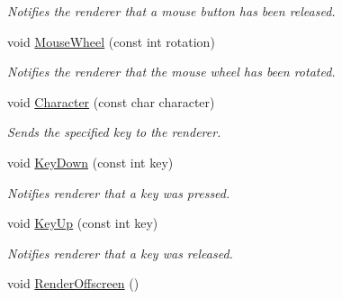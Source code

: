 \begin{DoxyCompactItemize}
\begin{DoxyCompactList}\small\item\em Notifies the renderer that a mouse button has been released. \end{DoxyCompactList}\item 
\hypertarget{class_u_i_renderer_a02a32cecd924b8a855bce495672f8e4e}{void \hyperlink{class_u_i_renderer_a02a32cecd924b8a855bce495672f8e4e}{Mouse\-Wheel} (const int rotation)}\label{class_u_i_renderer_a02a32cecd924b8a855bce495672f8e4e}

\begin{DoxyCompactList}\small\item\em Notifies the renderer that the mouse wheel has been rotated. \end{DoxyCompactList}\item 
\hypertarget{class_u_i_renderer_ac6c071a178d51415329bf4f4f71dfd48}{void \hyperlink{class_u_i_renderer_ac6c071a178d51415329bf4f4f71dfd48}{Character} (const char character)}\label{class_u_i_renderer_ac6c071a178d51415329bf4f4f71dfd48}

\begin{DoxyCompactList}\small\item\em Sends the specified key to the renderer. \end{DoxyCompactList}\item 
\hypertarget{class_u_i_renderer_af0f5ee9edad9a7a35b46187d3fb697ea}{void \hyperlink{class_u_i_renderer_af0f5ee9edad9a7a35b46187d3fb697ea}{Key\-Down} (const int key)}\label{class_u_i_renderer_af0f5ee9edad9a7a35b46187d3fb697ea}

\begin{DoxyCompactList}\small\item\em Notifies renderer that a key was pressed. \end{DoxyCompactList}\item 
\hypertarget{class_u_i_renderer_acf25d6ac3df945fde9054c34bf28edd1}{void \hyperlink{class_u_i_renderer_acf25d6ac3df945fde9054c34bf28edd1}{Key\-Up} (const int key)}\label{class_u_i_renderer_acf25d6ac3df945fde9054c34bf28edd1}

\begin{DoxyCompactList}\small\item\em Notifies renderer that a key was released. \end{DoxyCompactList}\item 
\hypertarget{class_u_i_renderer_a1299a480654f95b593f1b22117e2324a}{void \hyperlink{class_u_i_renderer_a1299a480654f95b593f1b22117e2324a}{Render\-Offscreen} ()}\label{class_u_i_renderer_a1299a480654f95b593f1b22117e2324a}


\end{DoxyCompactItemize}
